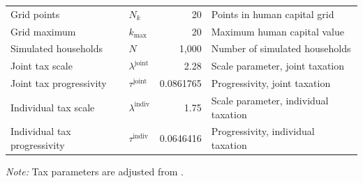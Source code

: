 \begin{table}[H]
\begin{tabularx}{\textwidth}{l l r X}
Grid points                & $N_k$                        & 20            & Points in human capital grid \\
Grid maximum               & $k_{\max}$                   & 20            & Maximum human capital value \\
Simulated households       & $N$                          & 1{,}000       & Number of simulated households \\
\hline
Joint tax scale            & $\lambda^{\text{joint}}$     & 2.28          & Scale parameter, joint taxation \\
Joint tax progressivity    & $\tau^{\text{joint}}$        & 0.0861765     & Progressivity, joint taxation \\
Individual tax scale       & $\lambda^{\text{indiv}}$     & 1.75          & Scale parameter, individual taxation \\
Individual tax progressivity & $\tau^{\text{indiv}}$      & 0.0646416     & Progressivity, individual taxation \\
\hline
\end{tabularx}
{\small \textit{Note:} Tax parameters are adjusted from \citet{borella2023}.}
\end{table}
